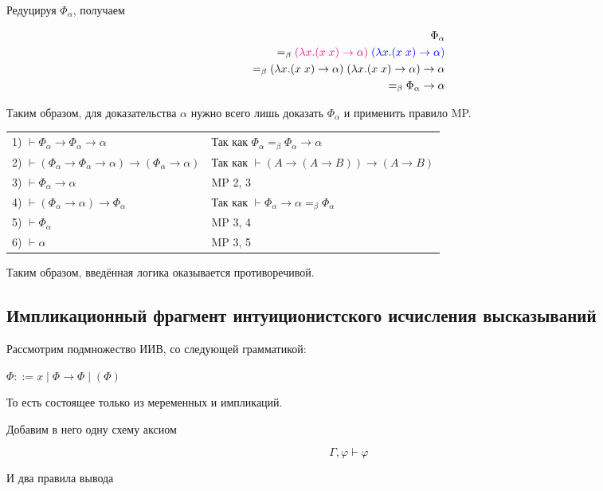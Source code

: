 Редуцируя $\Phi_{\alpha}$, получаем 

\begin{align*}
\Phi_{\alpha} \\ =_{\beta} \textcolor{magenta}{(\lambda x. (x \; x) \rightarrow \alpha)} \; \textcolor{blue}{(\lambda x. (x \; x) \rightarrow \alpha)} \\=_{\beta} (\lambda x. (x \; x) \rightarrow \alpha) \; (\lambda x. (x \; x) \rightarrow \alpha) \rightarrow \alpha \\=_{\beta} \Phi_{\alpha} \rightarrow \alpha
\end{align*}

Таким образом, для доказательства $\alpha$ нужно всего лишь доказать $\Phi_{\alpha}$ и применить правило MP.

\begin{tabular}{ll}
	1) $\vdash\Phi_\alpha\rightarrow\Phi_\alpha\rightarrow\alpha$ & Так как $\Phi_{\alpha} =_{\beta} \Phi_{\alpha} \rightarrow \alpha$\\
	2) $\vdash(\Phi_\alpha\rightarrow\Phi_\alpha\rightarrow\alpha)\rightarrow(\Phi_\alpha\rightarrow\alpha)$ & Так как $\vdash (A \rightarrow (A \rightarrow B)) \rightarrow (A \rightarrow B)$\\
	3) $\vdash\Phi_\alpha\rightarrow\alpha$ & MP 2, 3\\
	4) $\vdash (\Phi_\alpha \rightarrow \alpha) \rightarrow \Phi_\alpha$ & Так как $\vdash \Phi_\alpha \rightarrow \alpha =_{\beta} \Phi_\alpha$\\
	5) $\vdash\Phi_\alpha$ & MP 3, 4\\
	6) $\vdash\alpha$ & MP 3, 5
\end{tabular}

Таким образом, введённая логика оказывается противоречивой.

\subsection{Импликационный фрагмент интуиционистского исчисления высказываний}

Рассмотрим подмножество ИИВ, со следующей грамматикой:

$\Phi ::= x \; | \; \Phi \rightarrow \Phi \; | \; (\Phi)$

То есть состоящее только из меременных и импликаций. 

Добавим в него одну схему аксиом

$$\Gamma, \varphi \vdash \varphi$$

И два правила вывода

